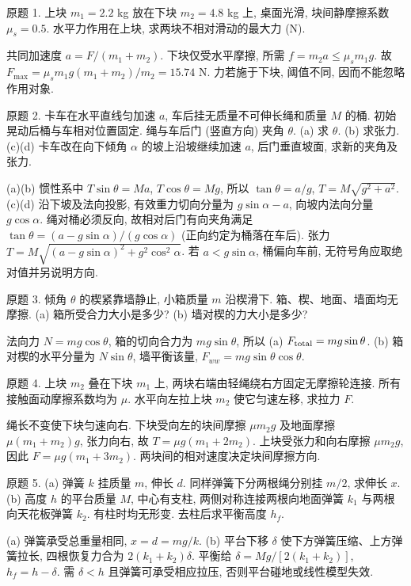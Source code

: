\begin{exercise}
原题 1. 上块 $m_1=2.2$ kg 放在下块 $m_2=4.8$ kg 上, 桌面光滑, 块间静摩擦系数 $\mu_s=0.5$. 水平力作用在上块, 求两块不相对滑动的最大力 (N).
\end{exercise}
\begin{solution}
共同加速度 $a=F/(m_1+m_2)$. 下块仅受水平摩擦, 所需 $f=m_2a\le\mu_sm_1g$. 故 $F_{\max}=\mu_sm_1g(m_1+m_2)/m_2=15.74$ N. 力若施于下块, 阈值不同, 因而不能忽略作用对象.
\end{solution}
\begin{exercise}
原题 2. 卡车在水平直线匀加速 $a$, 车后挂无质量不可伸长绳和质量 $M$ 的桶. 初始晃动后桶与车相对位置固定. 绳与车后门 (竖直方向) 夹角 $\theta$. (a) 求 $\theta$. (b) 求张力. (c)(d) 卡车改在向下倾角 $\alpha$ 的坡上沿坡继续加速 $a$, 后门垂直坡面, 求新的夹角及张力.
\end{exercise}
\begin{solution}
(a)(b) 惯性系中 $T\sin\theta=Ma$, $T\cos\theta=Mg$, 所以 $\tan\theta=a/g$, $T=M\sqrt{g^2+a^2}$. (c)(d) 沿下坡及法向投影, 有效重力切向分量为 $g\sin\alpha-a$, 向坡内法向分量 $g\cos\alpha$. 绳对桶必须反向, 故相对后门有向夹角满足 $\tan\theta=(a-g\sin\alpha)/(g\cos\alpha)$ (正向约定为桶落在车后). 张力 $T=M\sqrt{(a-g\sin\alpha)^2+g^2\cos^2\alpha}$. 若 $a<g\sin\alpha$, 桶偏向车前, 无符号角应取绝对值并另说明方向.
\end{solution}
\begin{exercise}
原题 3. 倾角 $\theta$ 的楔紧靠墙静止, 小箱质量 $m$ 沿楔滑下. 箱、楔、地面、墙面均无摩擦. (a) 箱所受合力大小是多少? (b) 墙对楔的力大小是多少?
\end{exercise}
\begin{solution}
法向力 $N=mg\cos\theta$, 箱的切向合力为 $mg\sin\theta$, 所以 (a) $F_{\rm total}=mg\sin\theta$. (b) 箱对楔的水平分量为 $N\sin\theta$, 墙平衡该量, $F_{ww}=mg\sin\theta\cos\theta$.
\end{solution}
\begin{exercise}
原题 4. 上块 $m_2$ 叠在下块 $m_1$ 上, 两块右端由轻绳绕右方固定无摩擦轮连接. 所有接触面动摩擦系数均为 $\mu$. 水平向左拉上块 $m_2$ 使它匀速左移, 求拉力 $F$.
\end{exercise}
\begin{solution}
绳长不变使下块匀速向右. 下块受向左的块间摩擦 $\mu m_2g$ 及地面摩擦 $\mu(m_1+m_2)g$, 张力向右, 故 $T=\mu g(m_1+2m_2)$. 上块受张力和向右摩擦 $\mu m_2g$, 因此 $F=\mu g(m_1+3m_2)$. 两块间的相对速度决定块间摩擦方向.
\end{solution}
\begin{exercise}
原题 5. (a) 弹簧 $k$ 挂质量 $m$, 伸长 $d$. 同样弹簧下分两根绳分别挂 $m/2$, 求伸长 $x$. (b) 高度 $h$ 的平台质量 $M$, 中心有支柱, 两侧对称连接两根向地面弹簧 $k_1$ 与两根向天花板弹簧 $k_2$. 有柱时均无形变. 去柱后求平衡高度 $h_f$.
\end{exercise}
\begin{solution}
(a) 弹簧承受总重量相同, $x=d=mg/k$. (b) 平台下移 $\delta$ 使下方弹簧压缩、上方弹簧拉长, 四根恢复力合为 $2(k_1+k_2)\delta$. 平衡给 $\delta=Mg/[2(k_1+k_2)]$, $h_f=h-\delta$. 需 $\delta<h$ 且弹簧可承受相应拉压, 否则平台碰地或线性模型失效.
\end{solution}
